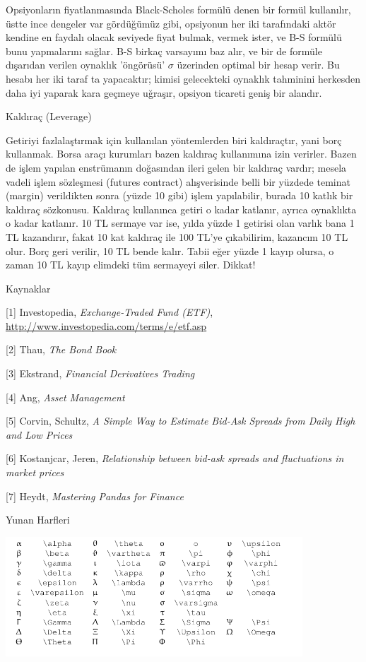 \documentclass[12pt,fleqn]{article}\usepackage{../../common}
\begin{document}
Opsiyonların fiyatlanmasında Black-Scholes formülü denen bir formül kullanılır,
üstte ince dengeler var gördüğümüz gibi, opsiyonun her iki tarafındaki aktör
kendine en faydalı olacak seviyede fiyat bulmak, vermek ister, ve B-S formülü
bunu yapmalarını sağlar. B-S birkaç varsayımı baz alır, ve bir de formüle
dışarıdan verilen oynaklık 'öngörüsü' $\sigma$ üzerinden optimal bir hesap
verir. Bu hesabı her iki taraf ta yapacaktır; kimisi gelecekteki oynaklık
tahminini herkesden daha iyi yaparak kara geçmeye uğraşır, opsiyon ticareti
geniş bir alandır.

Kaldıraç (Leverage)

Getiriyi fazlalaştırmak için kullanılan yöntemlerden biri kaldıraçtır, yani borç
kullanmak. Borsa araçı kurumları bazen kaldıraç kullanımına izin verirler. Bazen
de işlem yapılan enstrümanın doğasından ileri gelen bir kaldıraç vardır; mesela
vadeli işlem sözleşmesi (futures contract) alışverisinde belli bir yüzdede
teminat (margin) verildikten sonra (yüzde 10 gibi) işlem yapılabilir, burada 10
katlık bir kaldıraç sözkonusu. Kaldıraç kullanınca getiri o kadar katlanır,
ayrıca oynaklıkta o kadar katlanır. 10 TL sermaye var ise, yılda yüzde 1
getirisi olan varlık bana 1 TL kazandırır, fakat 10 kat kaldıraç ile 100 TL'ye
çıkabilirim, kazancım 10 TL olur. Borç geri verilir, 10 TL bende kalır. Tabii
eğer yüzde 1 kayıp olursa, o zaman 10 TL kayıp elimdeki tüm sermayeyi
siler. Dikkat! 

Kaynaklar 

[1] Investopedia, {\em Exchange-Traded Fund (ETF)}, \url{http://www.investopedia.com/terms/e/etf.asp}

[2] Thau, {\em The Bond Book}

[3] Ekstrand, {\em Financial Derivatives Trading}

[4] Ang, {\em Asset Management}

[5] Corvin, Schultz, {\em A Simple Way to Estimate Bid-Ask Spreads from Daily High and Low Prices}

[6] Kostanjcar, Jeren, {\em Relationship between bid-ask spreads and fluctuations in market prices}

[7] Heydt, {\em Mastering Pandas for Finance}

\newpage

Yunan Harfleri

\includegraphics[width=30em]{../../algs/algs_999_zapp/letters.png}
\end{document}

